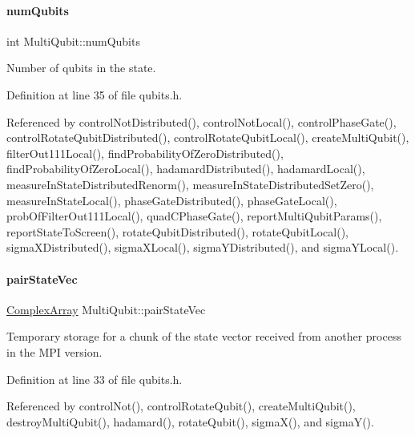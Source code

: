 \paragraph{\texorpdfstring{num\+Qubits}{numQubits}}
{\footnotesize\ttfamily int Multi\+Qubit\+::num\+Qubits}



Number of qubits in the state. 



Definition at line 35 of file qubits.\+h.



Referenced by control\+Not\+Distributed(), control\+Not\+Local(), control\+Phase\+Gate(), control\+Rotate\+Qubit\+Distributed(), control\+Rotate\+Qubit\+Local(), create\+Multi\+Qubit(), filter\+Out111\+Local(), find\+Probability\+Of\+Zero\+Distributed(), find\+Probability\+Of\+Zero\+Local(), hadamard\+Distributed(), hadamard\+Local(), measure\+In\+State\+Distributed\+Renorm(), measure\+In\+State\+Distributed\+Set\+Zero(), measure\+In\+State\+Local(), phase\+Gate\+Distributed(), phase\+Gate\+Local(), prob\+Of\+Filter\+Out111\+Local(), quad\+C\+Phase\+Gate(), report\+Multi\+Qubit\+Params(), report\+State\+To\+Screen(), rotate\+Qubit\+Distributed(), rotate\+Qubit\+Local(), sigma\+X\+Distributed(), sigma\+X\+Local(), sigma\+Y\+Distributed(), and sigma\+Y\+Local().

\mbox{\label{structMultiQubit_a76f7db4eab52d2b30f58f973ada809c5}} 
\paragraph{\texorpdfstring{pair\+State\+Vec}{pairStateVec}}
{\footnotesize\ttfamily \hyperlink{structComplexArray}{Complex\+Array} Multi\+Qubit\+::pair\+State\+Vec}



Temporary storage for a chunk of the state vector received from another process in the M\+PI version. 



Definition at line 33 of file qubits.\+h.



Referenced by control\+Not(), control\+Rotate\+Qubit(), create\+Multi\+Qubit(), destroy\+Multi\+Qubit(), hadamard(), rotate\+Qubit(), sigma\+X(), and sigma\+Y().

